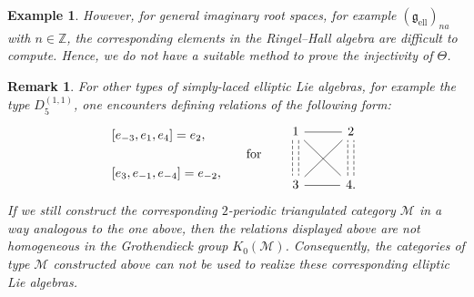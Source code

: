 \documentclass[12pt,reqno]{amsart}
\numberwithin{equation}{section}
\newcommand{\go}{{K_0}}
\newtheorem{example}[theorem]{Example}
\newtheorem{remark}[theorem]{Remark}
\begin{document}
\begin{example}
		However, for general imaginary root spaces, for example
		$(\mathfrak{g}_{\mathrm{ell}})_{na}$ with $n\in\mathbb{Z}$, the
		corresponding elements in the Ringel--Hall algebra are difficult to
		compute. Hence, we do not have a suitable method to prove the injectivity of $\Theta$.
	\end{example}
	
	
	\begin{remark}
		For other types of simply-laced elliptic Lie algebras, for example the
		type $D_5^{(1,1)}$, one encounters defining relations of the following
		form:
		\begin{equation}
			\begin{aligned}
				&[e_{-3},e_1,e_4]=e_2,\\
				\\
				&[e_3,e_{-1},e_{-4}]=e_{-2},
			\end{aligned}
			\qquad\text{for}\qquad
			\begin{tikzcd}[
				row sep=1.0cm,
				column sep=1.0cm,
				]
				1 & 2  \\
				3 & 4.
				\arrow[no head, from=1-1, to=1-2]
				\arrow[no head, from=1-1, to=2-2]
				\arrow[no head, from=1-2, to=2-1]
				\arrow[no head, from=2-1, to=2-2]
				\arrow[shift left, dashed, no head, from=2-2, to=1-2]
				\arrow[shift right, dashed, no head, from=2-2, to=1-2]
				\arrow[shift left, dashed, no head, from=1-1, to=2-1]
				\arrow[shift right, dashed, no head, from=1-1, to=2-1]
			\end{tikzcd}
		\end{equation}
		If we still construct the corresponding $2$-periodic triangulated
		category $\mathcal M$ in a way analogous to the one above, then the
		relations displayed above are not homogeneous in the Grothendieck
		group $\go (\mathcal{M})$. Consequently, the categories of type $\mathcal M$ constructed
		above can not be used to realize these corresponding elliptic Lie
		algebras.
	\end{remark}
	
	
	
	
	
	
	
	
	
	
	
\end{document}
